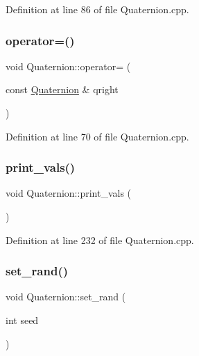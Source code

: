 Definition at line 86 of file Quaternion.\+cpp.

\mbox{\label{class_quaternion_a9d1803735257db933e01e7a6fa909d1a}} 
\subsubsection{\texorpdfstring{operator=()}{operator=()}}
{\footnotesize\ttfamily void Quaternion\+::operator= (\begin{DoxyParamCaption}\item[{const \mbox{\hyperlink{class_quaternion}{Quaternion}} \&}]{qright }\end{DoxyParamCaption})}



Definition at line 70 of file Quaternion.\+cpp.

\mbox{\label{class_quaternion_a6e39640890bd66e0d3ab8142b3773140}} 
\subsubsection{\texorpdfstring{print\+\_\+vals()}{print\_vals()}}
{\footnotesize\ttfamily void Quaternion\+::print\+\_\+vals (\begin{DoxyParamCaption}{ }\end{DoxyParamCaption})}



Definition at line 232 of file Quaternion.\+cpp.

\mbox{\label{class_quaternion_a213bd44408007e328bb3bc8b5ccbbc78}} 
\subsubsection{\texorpdfstring{set\+\_\+rand()}{set\_rand()}}
{\footnotesize\ttfamily void Quaternion\+::set\+\_\+rand (\begin{DoxyParamCaption}\item[{int}]{seed }\end{DoxyParamCaption})}



